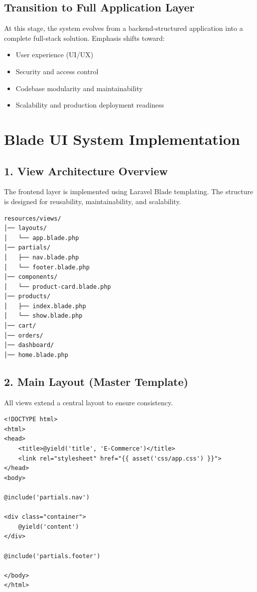 \documentclass[12pt,a4paper]{article}
\begin{document}
\subsection{Transition to Full Application Layer}

At this stage, the system evolves from a backend-structured application into a complete full-stack solution. Emphasis shifts toward:

\begin{itemize}[noitemsep]
    \item User experience (UI/UX)
    \item Security and access control
    \item Codebase modularity and maintainability
    \item Scalability and production deployment readiness
\end{itemize}

\section{Blade UI System Implementation}

\subsection{1. View Architecture Overview}

The frontend layer is implemented using Laravel Blade templating. The structure is designed for reusability, maintainability, and scalability.

\begin{verbatim}
resources/views/
│── layouts/
│   └── app.blade.php
│── partials/
│   ├── nav.blade.php
│   └── footer.blade.php
│── components/
│   └── product-card.blade.php
│── products/
│   ├── index.blade.php
│   └── show.blade.php
│── cart/
│── orders/
│── dashboard/
│── home.blade.php
\end{verbatim}

\subsection{2. Main Layout (Master Template)}

All views extend a central layout to ensure consistency.

\begin{verbatim}
<!DOCTYPE html>
<html>
<head>
    <title>@yield('title', 'E-Commerce')</title>
    <link rel="stylesheet" href="{{ asset('css/app.css') }}">
</head>
<body>

@include('partials.nav')

<div class="container">
    @yield('content')
</div>

@include('partials.footer')

</body>
</html>
\end{verbatim}
\end{document}
